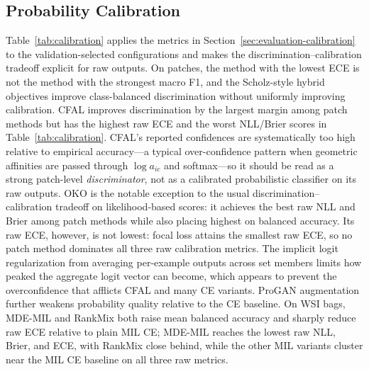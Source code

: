 \documentclass[11pt]{article}
\begin{document}
\subsection{Probability Calibration}
Table~\ref{tab:calibration} applies the metrics in Section~\ref{sec:evaluation-calibration} to the validation-selected configurations and makes the discrimination--calibration tradeoff explicit for raw outputs. On patches, the method with the lowest ECE is not the method with the strongest macro F1, and the Scholz-style hybrid objectives improve class-balanced discrimination without uniformly improving calibration. CFAL improves discrimination by the largest margin among patch methods but has the highest raw ECE and the worst NLL/Brier scores in Table~\ref{tab:calibration}. CFAL's reported confidences are systematically too high relative to empirical accuracy---a typical over-confidence pattern when geometric affinities are passed through $\log a_{ic}$ and softmax---so it should be read as a strong patch-level \emph{discriminator}, not as a calibrated probabilistic classifier on its raw outputs. OKO is the notable exception to the usual discrimination--calibration tradeoff on likelihood-based scores: it achieves the best raw NLL and Brier among patch methods while also placing highest on balanced accuracy. Its raw ECE, however, is not lowest: focal loss attains the smallest raw ECE, so no patch method dominates all three raw calibration metrics. The implicit logit regularization from averaging per-example outputs across set members limits how peaked the aggregate logit vector can become, which appears to prevent the overconfidence that afflicts CFAL and many CE variants. ProGAN augmentation further weakens probability quality relative to the CE baseline. On WSI bags, MDE-MIL and RankMix both raise mean balanced accuracy and sharply reduce raw ECE relative to plain MIL CE; MDE-MIL reaches the lowest raw NLL, Brier, and ECE, with RankMix close behind, while the other MIL variants cluster near the MIL CE baseline on all three raw metrics.

\begin{table}[htbp]
  \centering
  \small
  \caption{Held-out test calibration metrics for the validation-selected configurations after method-agnostic post-hoc temperature scaling. For each method and seed, the temperature is fit only on that seed's validation split and then applied to the test split. This table is the decision-facing probability comparison; Table~\ref{tab:calibration} is the raw-score diagnostic.}
  \label{tab:calibration-posthoc}
\end{table}
\end{document}
